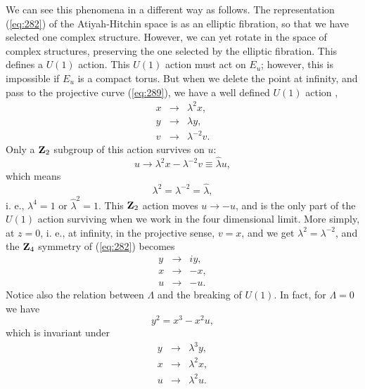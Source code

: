 We can see this phenomena in a different way as follows. The
representation (\ref{eq:282}) of the Atiyah-Hitchin space is as
an elliptic fibration, so that we have selected one complex
structure. However, we can yet rotate in the space of complex
structures, preserving the one selected by the elliptic
fibration. This defines a $U(1)$ action. This $U(1)$ action must
act on $E_u$; however, this is impossible if $E_u$ is a compact
torus. But when we delete the point at infinity, and pass to the
projective curve (\ref{eq:289}), we have a well defined $U(1)$
action \cite{SW3d},
\begin{eqnarray}
x & \rightarrow & \lambda^2 x, \nonumber \\
y & \rightarrow & \lambda y, \nonumber \\
v & \rightarrow & \lambda^{-2} v.
\label{eq:290}
\end{eqnarray}
Only a ${\bf Z}_2$ subgroup of this action survives on $u$:
\begin{equation}
u \rightarrow \lambda^2 x - \lambda^{-2} v \equiv \hat{\lambda}
u,
\label{eq:291}
\end{equation}
which means
\begin{equation}
\lambda^2 = \lambda^{-2} = \hat{\lambda},
\end{equation}
i. e., $\lambda^4=1$ or $\hat{\lambda}^2=1$. This ${\bf Z}_2$
action moves $u \rightarrow -u$, and is the only part of the
$U(1)$ action surviving when we work in the four dimensional
limit. More simply, at $z=0$, i. e., at infinity, in the
projective sense, $v=x$, and we get $\lambda^2=\lambda^{-2}$, and
the ${\bf Z}_4$ symmetry of (\ref{eq:282}) becomes
\begin{eqnarray}
y & \rightarrow & iy, \nonumber \\
x & \rightarrow & -x, \nonumber \\
u & \rightarrow & -u.
\label{eq:292}
\end{eqnarray}
Notice also the relation between $\Lambda$ and the breaking of
$U(1)$. In fact, for $\Lambda=0$ we have
\begin{equation}
y^2 = x^3 -x^2 u,
\label{eq:293}
\end{equation}
which is invariant under 
\begin{eqnarray}
y & \rightarrow & \lambda^3 y, \nonumber \\
x & \rightarrow & \lambda^2 x, \nonumber \\
u & \rightarrow & \lambda^2 u.
\label{eq:294}
\end{eqnarray}




